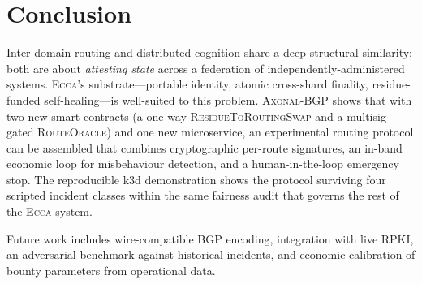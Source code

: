 \documentclass[11pt,twocolumn]{article}
\theoremstyle{definition}
\theoremstyle{plain}
\theoremstyle{remark}
\newcommand{\ecca}{\textsc{Ecca}}
\newcommand{\axonal}{\textsc{Axonal-BGP}}
\newcommand{\contractname}[1]{\textsc{#1}}
\begin{document}
\section{Conclusion}\label{sec:conclusion}

Inter-domain routing and distributed cognition share a deep structural similarity: both are about \emph{attesting state} across a federation of independently-administered systems. \ecca{}'s substrate---portable identity, atomic cross-shard finality, residue-funded self-healing---is well-suited to this problem. \axonal{} shows that with two new smart contracts (a one-way \contractname{ResidueToRoutingSwap} and a multisig-gated \contractname{RouteOracle}) and one new microservice, an experimental routing protocol can be assembled that combines cryptographic per-route signatures, an in-band economic loop for misbehaviour detection, and a human-in-the-loop emergency stop. The reproducible k3d demonstration shows the protocol surviving four scripted incident classes within the same fairness audit that governs the rest of the \ecca{} system.

Future work includes wire-compatible BGP encoding, integration with live RPKI, an adversarial benchmark against historical incidents, and economic calibration of bounty parameters from operational data.

\balance



\end{document}
